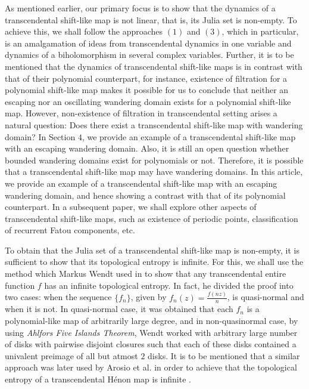 \documentclass[12pt, reqno]{amsart}
\numberwithin{equation}{section}
\theoremstyle{definition}
\theoremstyle{remark}
\theoremstyle{plain}
\theoremstyle{definition}
\numberwithin{equation}{section}
\begin{document}
As  mentioned earlier, our primary focus is to show that the dynamics of a transcendental shift-like map is not linear, that is, its Julia set is non-empty. To achieve this, we shall follow the approaches $(1)$ and $(3)$, which in particular, is an amalgamation of ideas from transcendental dynamics in one variable and dynamics of a biholomorphism in several complex variables. Further, it is to be mentioned that the dynamics of transcendental shift-like maps is in contrast with that of their polynomial counterpart, for instance, existence of filtration for a polynomial shift-like map makes it possible for us to conclude that neither an escaping nor an oscillating wandering domain exists for a polynomial shift-like map. However, non-existence of filtration in transcendental setting arises a natural question: Does there exist a transcendental shift-like map with wandering domain? In Section $4$, we provide an example of a transcendental shift-like map with an escaping wandering domain. Also, it is still an open question  whether bounded wandering domains  exist for polynomials or not. Therefore, it is possible that a transcendental shift-like map may have wandering domains. In this article, we provide an example of a transcendental shift-like map with an escaping wandering domain, and hence showing a contrast with that of its polynomial counterpart. In a subsequent paper, we shall explore other aspects of transcendental shift-like maps, such as existence of periodic points, classification of recurrent Fatou components, etc.

To obtain that the Julia set of a transcendental shift-like map is non-empty, it is sufficient to show that its  topological entropy is infinite. For this, we shall use the method which Markus Wendt used in  \cite{Wendt} to show that any transcendental entire function $f$ has an infinite topological entropy. In fact, he divided the proof into two cases: when the sequence $\{f_n\}$, given by $f_n(z)=\frac{f(nz)}{n}$, is quasi-normal and when it is not. In quasi-normal case, it was obtained that each $f_n$ is a polynomial-like map of arbitrarily large degree, and in non-quasinormal case, by using \emph{Ahlfors Five Islands Theorem}, Wendt worked with arbitrary large number of disks with pairwise disjoint closures such that each of these disks contained a univalent preimage of all but atmost $2$ disks. 
It is to be mentioned that a similar approach was later used by Arosio et al. in order to achieve that the topological entropy of a transcendental H\'enon map is infinite \cite{Arosio3}.
\end{document}
